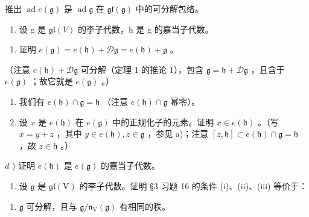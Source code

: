 推出 \(\operatorname{ad} e(\mathfrak{g})\) 是 \(\operatorname{ad} \mathfrak{g}\) 在 \(\mathfrak{gl}(\mathfrak{g})\) 中的可分解包络。

\begin{enumerate}
\def\labelenumi{\arabic{enumi})}
\setcounter{enumi}{7}
\tightlist
\item
  设 g 是 \(\mathfrak{gl}(V)\) 的李子代数，h 是 g 的嘉当子代数。
\end{enumerate}

\begin{enumerate}
\def\labelenumi{\alph{enumi})}
\tightlist
\item
  证明 \(e(\mathfrak{g}) = e(\mathfrak{h}) + \mathcal{D}\mathfrak{g} = e(\mathfrak{h}) + \mathfrak{g}\) 。
\end{enumerate}

（注意 \(e(\mathfrak{h}) + \mathcal{D}\mathfrak{g}\) 可分解（定理 1 的推论 1），包含 \(\mathfrak{g} = \mathfrak{h} + \mathcal{D}\mathfrak{g}\) ，且含于 \(e(\mathfrak{g})\) ；故它就是 \(e(\mathfrak{g})\) 。）

\begin{enumerate}
\def\labelenumi{\alph{enumi})}
\setcounter{enumi}{1}
\item
  我们有 \(e(\mathfrak{h}) \cap \mathfrak{g} = \mathfrak{h}\) （注意 \(e(\mathfrak{h}) \cap \mathfrak{g}\) 幂零）。
\item
  设 \(x\) 是 \(e(\mathfrak{h})\) 在 \(e(\mathfrak{g})\) 中的正规化子的元素。证明 \(x \in e(\mathfrak{h})\) 。（写 \(x = y + z\) ，其中 \(y \in e(\mathfrak{h}), z \in \mathfrak{g}\) ，参见 a)；注意 \([z, \mathfrak{h}] \subset e(\mathfrak{h}) \cap \mathfrak{g} = \mathfrak{h}\) ，故 \(z \in \mathfrak{h}\) 。）
\end{enumerate}

\(d\) ) 证明 \(e(\mathfrak{h})\) 是 \(e(\mathfrak{g})\) 的嘉当子代数。

\begin{enumerate}
\def\labelenumi{\arabic{enumi})}
\setcounter{enumi}{8}
\tightlist
\item
  设 \(\mathfrak{g}\) 是 \(\mathfrak{gl}(\mathrm{V})\) 的李子代数。证明 §3 习题 16 的条件 (i)、(ii)、(iii) 等价于：
\end{enumerate}

\begin{enumerate}
\def\labelenumi{(\alph{enumi})}
\setcounter{enumi}{21}
\tightlist
\item
  \(\mathfrak{g}\) 可分解，且与 \(\mathfrak{g} / \mathfrak{n}_{\mathrm{V}}(\mathfrak{g})\) 有相同的秩。
\end{enumerate}

